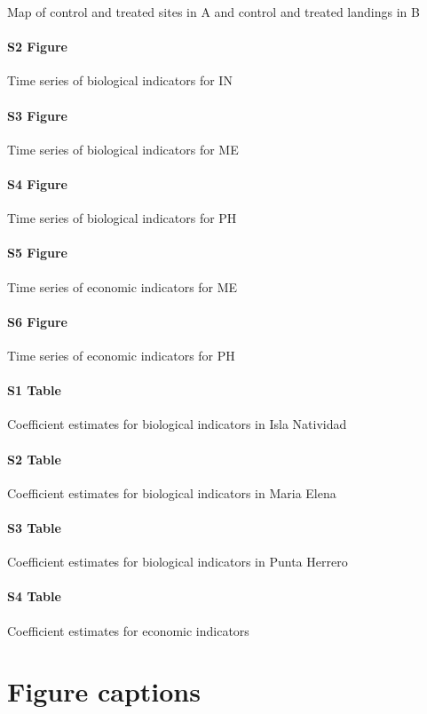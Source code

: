 \documentclass{frontiersSCNS}
\theoremstyle{definition}
\theoremstyle{definition}
\theoremstyle{definition}
\theoremstyle{remark}
\begin{document}
Map of control and treated sites in A and control and treated landings
in B

\paragraph*{S2 Figure}
\label{S2_Figure}

Time series of biological indicators for IN

\paragraph*{S3 Figure}
\label{S3_Figure}

Time series of biological indicators for ME

\paragraph*{S4 Figure}
\label{S4_Figure}

Time series of biological indicators for PH

\paragraph*{S5 Figure}
\label{S5_Figure}

Time series of economic indicators for ME

\paragraph*{S6 Figure}
\label{S6_Figure}

Time series of economic indicators for PH

\paragraph*{S1 Table}
\label{S1_Table}

Coefficient estimates for biological indicators in Isla Natividad

\paragraph*{S2 Table}
\label{S2_Table}

Coefficient estimates for biological indicators in Maria Elena

\paragraph*{S3 Table}
\label{S3_Table}

Coefficient estimates for biological indicators in Punta Herrero

\paragraph*{S4 Table}
\label{S4_Table}

Coefficient estimates for economic indicators



\section*{Figure captions}
\end{document}
